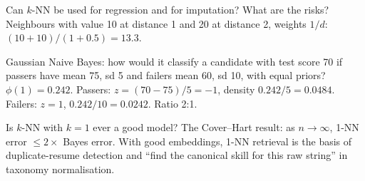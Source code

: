 \begin{qa}{\deep Can $k$-NN be used for regression and for imputation? What are the risks?}
\worked Neighbours with value 10 at distance 1 and 20 at distance 2, weights $1/d$: $(10 + 10)/(1 + 0.5) = 13.3$.
\end{qa}

\begin{qa}{Gaussian Naive Bayes: how would it classify a candidate with test score 70 if passers have mean 75, sd 5 and failers mean 60,
sd 10, with equal priors?}
\why $\phi(1) = 0.242$. Passers: $z = (70-75)/5 = -1$, density $0.242/5 = 0.0484$. Failers: $z = 1$, $0.242/10 = 0.0242$. Ratio 2:1.
\end{qa}

\begin{qa}{\deep Is $k$-NN with $k = 1$ ever a good model?}
\why The Cover--Hart result: as $n\to\infty$, 1-NN error $\le 2\times$ Bayes error. With good embeddings, 1-NN retrieval is the basis of
duplicate-resume detection and ``find the canonical skill for this raw string'' in taxonomy normalisation.
\end{qa}
